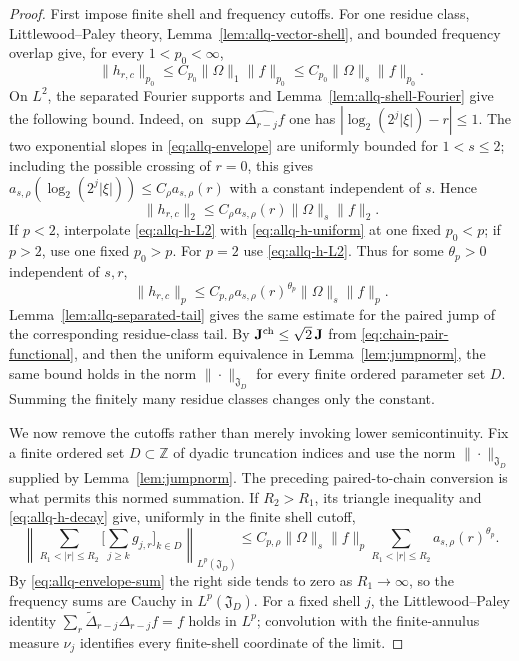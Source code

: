 \documentclass[11pt]{article}
\numberwithin{equation}{section}
\theoremstyle{remark}
\theoremstyle{definition}
\newcommand{\supp}{\operatorname{supp}}
\begin{document}
\begin{proof}
First impose finite shell and frequency cutoffs.  For one residue class,
Littlewood--Paley theory, Lemma~\ref{lem:allq-vector-shell}, and bounded
frequency overlap give, for every $1<p_0<\infty$,
\begin{equation}\label{eq:allq-h-uniform}
 \|h_{r,c}\|_{p_0}\le C_{p_0}\|\Omega\|_1\|f\|_{p_0}
 \le C_{p_0}\|\Omega\|_s\|f\|_{p_0}.
\end{equation}
On $L^2$, the separated Fourier supports and
Lemma~\ref{lem:allq-shell-Fourier} give the following bound.  Indeed, on
$\supp\widehat{\Delta_{r-j}f}$ one has
$|\log_2(2^j|\xi|)-r|\le1$.  The two exponential slopes in
\eqref{eq:allq-envelope} are uniformly bounded for $1<s\le2$; including
the possible crossing of $r=0$, this gives
$a_{s,\rho}(\log_2(2^j|\xi|))\le C_\rho a_{s,\rho}(r)$ with a constant
independent of $s$.  Hence
\begin{equation}\label{eq:allq-h-L2}
 \|h_{r,c}\|_2
 \le C_\rho a_{s,\rho}(r)\|\Omega\|_s\|f\|_2.
\end{equation}
If $p<2$, interpolate \eqref{eq:allq-h-L2} with
\eqref{eq:allq-h-uniform} at one fixed $p_0<p$; if $p>2$, use one fixed
$p_0>p$.  For $p=2$ use \eqref{eq:allq-h-L2}.  Thus for some
$\theta_p>0$ independent of $s,r$,
\begin{equation}\label{eq:allq-h-decay}
 \|h_{r,c}\|_p
 \le C_{p,\rho}a_{s,\rho}(r)^{\theta_p}
 \|\Omega\|_s\|f\|_p.
\end{equation}
Lemma~\ref{lem:allq-separated-tail} gives the same estimate for the paired
jump of the corresponding residue-class tail.  By
$\mathbf J^{\rm ch}\le\sqrt2\,\mathbf J$ from
\eqref{eq:chain-pair-functional}, and then the uniform equivalence in
Lemma~\ref{lem:jumpnorm}, the same bound holds in the norm
$\|\cdot\|_{\mathfrak J_D}$ for every finite ordered parameter set $D$.
Summing the finitely many residue classes changes only the constant.

We now remove the cutoffs rather than merely invoking lower
semicontinuity.  Fix a finite ordered set $D\subset\mathbb Z$ of dyadic
truncation indices and use the norm $\|\cdot\|_{\mathfrak J_D}$ supplied by
Lemma~\ref{lem:jumpnorm}.  The preceding paired-to-chain conversion is
what permits this normed summation.  If $R_2>R_1$, its triangle
inequality and \eqref{eq:allq-h-decay} give, uniformly in the finite shell
cutoff,
\[
 \left\|\sum_{R_1<|r|\le R_2}
  \biggl[\sum_{j\ge k}g_{j,r}\biggr]_{k\in D}
 \right\|_{L^p(\mathfrak J_D)}
 \le C_{p,\rho}\|\Omega\|_s\|f\|_p
 \sum_{R_1<|r|\le R_2}a_{s,\rho}(r)^{\theta_p}.
\]
By \eqref{eq:allq-envelope-sum} the right side tends to zero as
$R_1\to\infty$, so the frequency sums are Cauchy in
$L^p(\mathfrak J_D)$.  For a fixed shell $j$, the Littlewood--Paley
identity $\sum_r\widetilde\Delta_{r-j}\Delta_{r-j}f=f$ holds in $L^p$; convolution with the
finite-annulus measure $\nu_j$ identifies every finite-shell coordinate of
the limit.


\end{proof}
\end{document}
